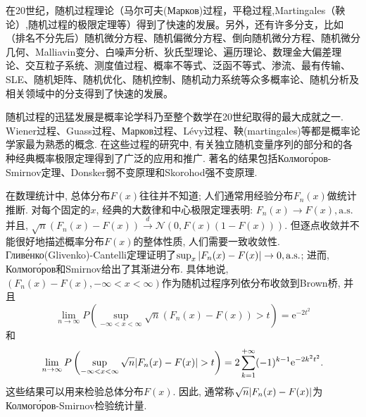\documentclass[a4paper,AutoFakeBold,oneside,12pt]{article}
\begin{document}
在20世纪，随机过程理论（马尔可夫(Марков)过程，平稳过程,Martingales（鞅论）,随机过程的极限定理等）得到了快速的发展。另外，还有许多分支，比如（排名不分先后）随机微分方程、随机偏微分方程、倒向随机微分方程、随机微分几何、Malliavin变分、白噪声分析、狄氏型理论、遍历理论、数理金大偏差理论、交互粒子系统、测度值过程、概率不等式、泛函不等式、渗流、最有传输、SLE、随机矩阵、随机优化、随机控制、随机动力系统等众多概率论、随机分析及相关领域中的分支得到了快速的发展。
	
随机过程的迅猛发展是概率论学科乃至整个数学在20世纪取得的最大成就之一. Wiener过程、Guass过程、Марков过程、Lévy过程、鞅(martingales)等都是概率论学家最为熟悉的概念. 在这些过程的研究中, 有关独立随机变量序列的部分和的各种经典概率极限定理得到了广泛的应用和推广. 著名的结果包括Колмого́ров-Smirnov定理、Donsker弱不变原理和Skorohod强不变原理.

在数理统计中, 总体分布$F(x)$往往并不知道; 人们通常用经验分布$F_n(x)$做统计推断. 对每个固定的$x$, 经典的大数律和中心极限定理表明: $F_n(x)\to F(x),\mathrm{a.s.}$并且, $\sqrt{n}(F_n(x)-F(x))\stackrel{d}{\rightarrow}\mathcal{N}(0,F(x)(1-F(x)))$. 但逐点收敛并不能很好地描述概率分布$F(x)$的整体性质, 人们需要一致收敛性. Гливе́нко(Glivenko)-Cantelli定理证明了$\sup_x\abs{F_n(x)-F(x)}\to 0,\mathrm{a.s.}$; 进而, Колмого́ров和Smirnov给出了其渐进分布. 具体地说, $(F_n(x)-F(x),-\infty<x<\infty)$作为随机过程序列依分布收敛到Brown桥, 并且\begin{equation}
	\lim_{n\to\infty}P\left( \sup_{-\infty<x<\infty}\sqrt{n}(F_n(x)-F(x))>t \right) = \mathrm{e}^{-2t^2}
\end{equation}
和\begin{equation}
\lim_{n\to\infty}P\left( \sup_{-\infty<x<\infty}\sqrt{n}\abs{F_n(x)-F(x)}>t \right) = 2\sum_{k = 1}^{+\infty}(-1)^{k-1}\mathrm{e}^{-2k^2t^2}.
\end{equation}
	这些结果可以用来检验总体分布$F(x)$. 因此, 通常称$\sqrt{n}\abs{F_n(x)-F(x)}$为Колмого́ров-Smirnov检验统计量.
	
\end{document}
